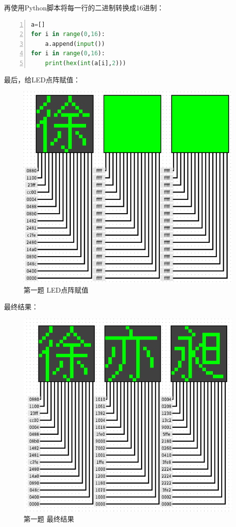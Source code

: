 \documentclass[UTF8]{ctexart}
\begin{document}
再使用Python脚本将每一行的二进制转换成16进制：
\begin{lstlisting}[language={python},numbers=left,numberstyle=\tiny,%frame=shadowbox,  
    rulesepcolor=\color{red!20!green!20!blue!20},  
    keywordstyle=\color{blue!70!black},  
    commentstyle=\color{blue!90!},  
    basicstyle=\ttfamily]
a=[]
for i in range(0,16):
    a.append(input())
for i in range(0,16):
    print(hex(int(a[i],2)))
\end{lstlisting}
最后，给LED点阵赋值：
\begin{figure}[h!]
    \centering
    \includegraphics[scale=0.6]{p1_s4.PNG}
    \caption{第一题 LED点阵赋值}
\end{figure}
\newline
最终结果：
\begin{figure}[h!]
    \centering
    \includegraphics[scale=0.6]{p1.PNG}
    \caption{第一题 最终结果}
\end{figure}
\end{document}
